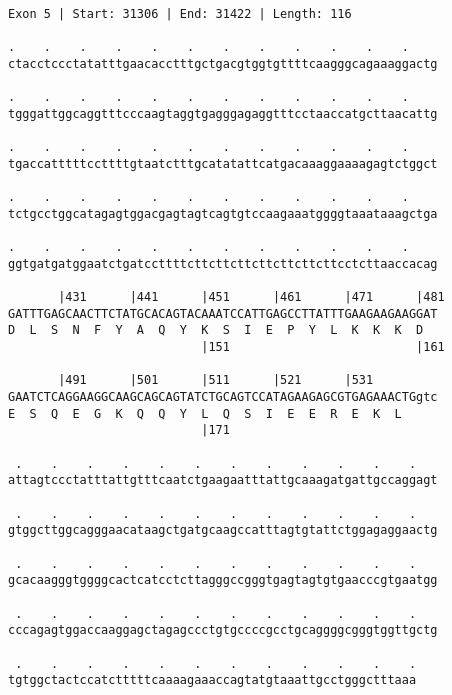 \documentclass{article}
\begin{document}
\begin{Verbatim}
Exon 5 | Start: 31306 | End: 31422 | Length: 116
 
.    .    .    .    .    .    .    .    .    .    .    .    
ctacctccctatatttgaacacctttgctgacgtggtgttttcaagggcagaaaggactg
  
.    .    .    .    .    .    .    .    .    .    .    .    
tgggattggcaggtttcccaagtaggtgagggagaggtttcctaaccatgcttaacattg
  
.    .    .    .    .    .    .    .    .    .    .    .    
tgaccatttttccttttgtaatctttgcatatattcatgacaaaggaaaagagtctggct
  
.    .    .    .    .    .    .    .    .    .    .    .    
tctgcctggcatagagtggacgagtagtcagtgtccaagaaatggggtaaataaagctga
  
.    .    .    .    .    .    .    .    .    .    .    .    
ggtgatgatggaatctgatccttttcttcttcttcttcttcttcttcctcttaaccacag
  
       |431      |441      |451      |461      |471      |481
GATTTGAGCAACTTCTATGCACAGTACAAATCCATTGAGCCTTATTTGAAGAAGAAGGAT
D  L  S  N  F  Y  A  Q  Y  K  S  I  E  P  Y  L  K  K  K  D  
                           |151                          |161
  
       |491      |501      |511      |521      |531         
GAATCTCAGGAAGGCAAGCAGCAGTATCTGCAGTCCATAGAAGAGCGTGAGAAACTGgtc
E  S  Q  E  G  K  Q  Q  Y  L  Q  S  I  E  E  R  E  K  L     
                           |171                             
  
 .    .    .    .    .    .    .    .    .    .    .    .   
attagtccctatttattgtttcaatctgaagaatttattgcaaagatgattgccaggagt
  
 .    .    .    .    .    .    .    .    .    .    .    .   
gtggcttggcagggaacataagctgatgcaagccatttagtgtattctggagaggaactg
  
 .    .    .    .    .    .    .    .    .    .    .    .   
gcacaagggtggggcactcatcctcttagggccgggtgagtagtgtgaacccgtgaatgg
  
 .    .    .    .    .    .    .    .    .    .    .    .   
cccagagtggaccaaggagctagagccctgtgccccgcctgcaggggcgggtggttgctg
  
 .    .    .    .    .    .    .    .    .    .    .    .
tgtggctactccatctttttcaaaagaaaccagtatgtaaattgcctgggctttaaa
\end{Verbatim}
\newpage
\end{document}
